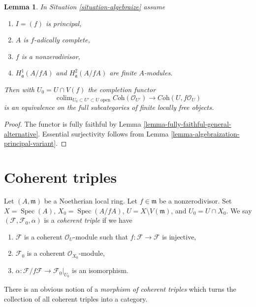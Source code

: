 \documentclass{stacks-project}
\theoremstyle{plain}
\newtheorem{lemma}[subsection]{Lemma}
\theoremstyle{definition}
\theoremstyle{remark}
\numberwithin{equation}{subsection}
\def\colim{\mathop{\mathrm{colim}}\nolimits}
\def\Spec{\mathop{\mathrm{Spec}}}
\begin{document}
\begin{lemma}
\label{lemma-equivalence}
In Situation \ref{situation-algebraize} assume
\begin{enumerate}
\item $I = (f)$ is principal,
\item $A$ is $f$-adically complete,
\item $f$ is a nonzerodivisor,
\item $H^1_\mathfrak a(A/fA)$ and $H^2_\mathfrak a(A/fA)$
are finite $A$-modules.
\end{enumerate}
Then with $U_0 = U \cap V(f)$ the completion functor
$$
\colim_{U_0 \subset U' \subset U\text{ open}}
\textit{Coh}(\mathcal{O}_{U'})
\longrightarrow
\textit{Coh}(U, f\mathcal{O}_U)
$$
is an equivalence on the full subcategories of finite locally free objects.
\end{lemma}

\begin{proof}
The functor is fully faithful by
Lemma \ref{lemma-fully-faithful-general-alternative}.
Essential surjectivity follows from
Lemma \ref{lemma-algebraization-principal-variant}.
\end{proof}








\section{Coherent triples}
\label{section-coherent-triples}

\noindent
Let $(A, \mathfrak m)$ be a Noetherian local ring.
Let $f \in \mathfrak m$ be a nonzerodivisor. Set
$X = \Spec(A)$, $X_0 = \Spec(A/fA)$, $U = X \setminus V(\mathfrak m)$, and
$U_0 = U \cap X_0$.
We say $(\mathcal{F}, \mathcal{F}_0, \alpha)$ is a {\it coherent triple}
if we have
\begin{enumerate}
\item $\mathcal{F}$ is a coherent $\mathcal{O}_U$-module such that
$f : \mathcal{F} \to \mathcal{F}$ is injective,
\item $\mathcal{F}_0$ is a coherent $\mathcal{O}_{X_0}$-module,
\item $\alpha : \mathcal{F}/f\mathcal{F} \to \mathcal{F}_0|_{U_0}$
is an isomorphism.
\end{enumerate}
There is an obvious notion of a {\it morphism of coherent triples}
which turns the collection of all coherent triples into a category.
\end{document}
